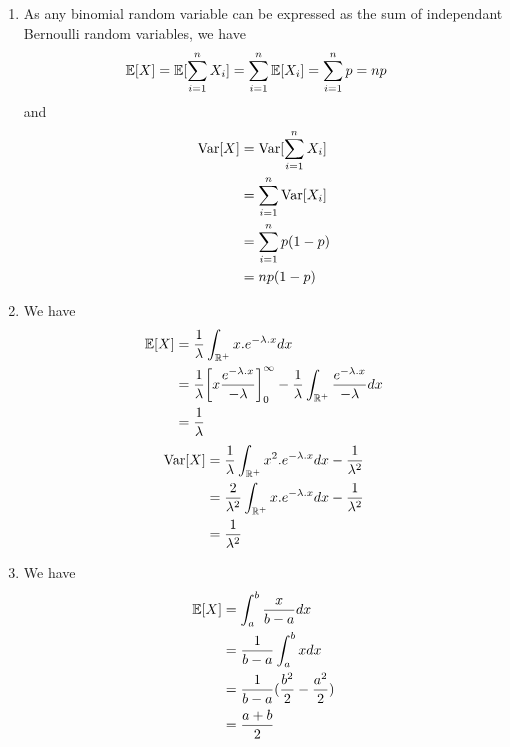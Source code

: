 \begin{solution}
  \begin{enumerate}
    \item As any binomial random variable can be expressed as the sum of independant Bernoulli random variables, we have
          \begin{align*}
            \mathbb{E}[X] & = \mathbb{E}[\sum_{i=1}^{n} X_i] = \sum_{i=1}^{n} \mathbb{E}[X_i] = \sum_{i=1}^{n} p = np
          \end{align*}
          and
          \begin{align*}
            \operatorname{Var}[X] & = \operatorname{Var}[\sum_{i=1}^{n} X_i] \\
                    & = \sum_{i=1}^{n} \operatorname{Var}[X_i] \\
                    & = \sum_{i=1}^{n} p(1-p)    \\
                    & = np(1-p)
          \end{align*}
    \item We have
          \begin{align*}
            \mathbb{E}[X] & = \frac{1}{\lambda} \int_{\mathbb{R}^+} x.e^{-\lambda.x} dx                                                                                                \\
                          & = \frac{1}{\lambda} {\left[ x \frac{e^{-\lambda.x}}{-\lambda} \right]}_0^\infty - \frac{1}{\lambda} \int_{\mathbb{R}^+} \frac{e^{-\lambda.x}}{-\lambda} dx \\
                          & = \frac{1}{\lambda}
          \end{align*}
          \begin{align*}
            \operatorname{Var}[X] & = \frac{1}{\lambda} \int_{\mathbb{R}^+} x^2.e^{-\lambda.x} dx - \frac{1}{\lambda^2} \\
                    & = \frac{2}{\lambda^2} \int_{\mathbb{R}^+} x.e^{-\lambda.x} dx - \frac{1}{\lambda^2} \\
                    & = \frac{1}{\lambda^2}
          \end{align*}
    \item We have
          \begin{align*}
            \mathbb{E}[X] & = \int_{a}^{b} \frac{x}{b-a} dx                 \\
                          & = \frac{1}{b-a} \int_{a}^{b} x dx               \\
                          & = \frac{1}{b-a} (\frac{b^2}{2} - \frac{a^2}{2}) \\
                          & = \frac{a+b}{2}
          \end{align*}
  \end{enumerate}
\end{solution}

